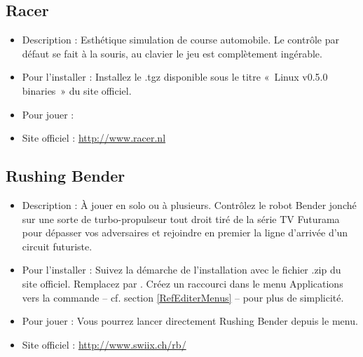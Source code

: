 \subsection{Racer}
\begin{itemize}
\begingroup
{}
\item Description : Esthétique simulation de course automobile. Le contrôle par défaut se fait à la souris, au clavier le jeu est complètement ingérable.{\par}
\item Pour l'installer : Installez le .tgz disponible sous le titre «~Linux v0.5.0 binaries~» du site officiel.{\par}
\item Pour jouer : 
\item Site officiel : \url{http://www.racer.nl}{\par}
\endgroup
\end{itemize}
\subsection{Rushing Bender}
\begin{itemize}
\begingroup
{}
\item Description : À jouer en solo ou à plusieurs. Contrôlez le robot Bender jonché sur une sorte de turbo-propulseur tout droit tiré de la série TV Futurama pour dépasser vos adversaires et rejoindre en premier la ligne d'arrivée d'un circuit futuriste.{\par}
\endgroup
\item Pour l'installer : Suivez la démarche de l'installation avec le fichier .zip  du  site officiel. Remplacez  par . Créez un raccourci dans le menu Applications vers la commande  -- cf. section \ref{RefEditerMenus} -- pour plus de simplicité.{\par}
\item Pour jouer : Vous pourrez lancer directement Rushing Bender depuis le menu.{\par}
\item Site officiel : \url{http://www.swiix.ch/rb/}{\par}
\end{itemize}
